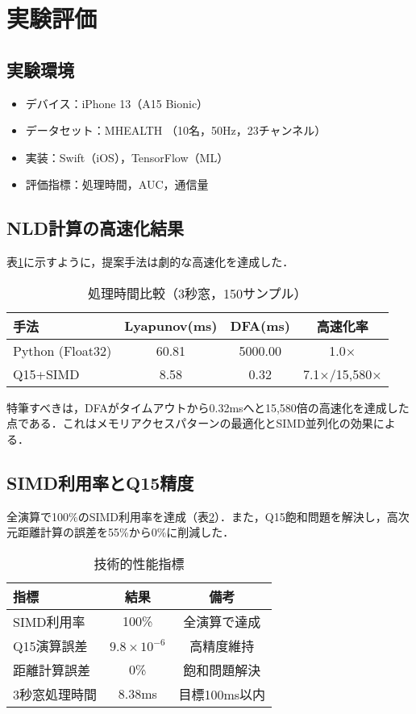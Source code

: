 \documentclass[paper]{ieice}
\begin{document}
\section{実験評価}

\subsection{実験環境}
\begin{itemize}
\item デバイス：iPhone 13（A15 Bionic）
\item データセット：MHEALTH \cite{banos2014}（10名，50Hz，23チャンネル）
\item 実装：Swift（iOS），TensorFlow（ML）
\item 評価指標：処理時間，AUC，通信量
\end{itemize}

\subsection{NLD計算の高速化結果}

表\ref{tab:speedup}に示すように，提案手法は劇的な高速化を達成した．

\begin{table}[t]
\caption{処理時間比較（3秒窓，150サンプル）}
\label{tab:speedup}
\centering
\begin{tabular}{lccc}
\toprule
手法 & Lyapunov(ms) & DFA(ms) & 高速化率 \\
\midrule
Python (Float32) & 60.81 & 5000.00 & 1.0× \\
Q15+SIMD & 8.58 & 0.32 & 7.1×/15,580× \\
\bottomrule
\end{tabular}
\end{table}

特筆すべきは，DFAがタイムアウトから0.32msへと15,580倍の高速化を達成した点である．これはメモリアクセスパターンの最適化とSIMD並列化の効果による．

\subsection{SIMD利用率とQ15精度}

全演算で100\%のSIMD利用率を達成（表\ref{tab:technical}）．また，Q15飽和問題を解決し，高次元距離計算の誤差を55\%から0\%に削減した．

\begin{table}[t]
\caption{技術的性能指標}
\label{tab:technical}
\centering
\begin{tabular}{lcc}
\toprule
指標 & 結果 & 備考 \\
\midrule
SIMD利用率 & 100\% & 全演算で達成 \\
Q15演算誤差 & $9.8 \times 10^{-6}$ & 高精度維持 \\
距離計算誤差 & 0\% & 飽和問題解決 \\
3秒窓処理時間 & 8.38ms & 目標100ms以内 \\
\bottomrule
\end{tabular}
\end{table}
\end{document}
